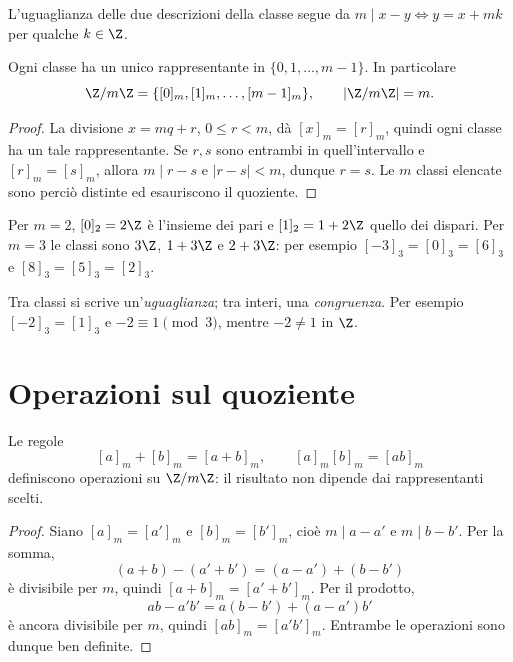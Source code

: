 L'uguaglianza delle due descrizioni della classe segue da $m\mid x-y\iff y=x+mk$ per qualche $k\in\Z$.

\begin{proposizione}
Ogni classe ha un unico rappresentante in $\{0,1,\ldots,m-1\}$. In particolare
\[
\Z/m\Z=\{[0]_m,[1]_m,\ldots,[m-1]_m\},\qquad |\Z/m\Z|=m.
\]
\end{proposizione}
\begin{proof}
La divisione $x=mq+r$, $0\le r<m$, dà $[x]_m=[r]_m$, quindi ogni classe ha un tale rappresentante. Se $r,s$ sono entrambi in quell'intervallo e $[r]_m=[s]_m$, allora $m\mid r-s$ e $|r-s|<m$, dunque $r=s$. Le $m$ classi elencate sono perciò distinte ed esauriscono il quoziente.
\end{proof}

\begin{esempio}
Per $m=2$, $[0]_2=2\Z$ è l'insieme dei pari e $[1]_2=1+2\Z$ quello dei dispari. Per $m=3$ le classi sono $3\Z$, $1+3\Z$ e $2+3\Z$: per esempio $[-3]_3=[0]_3=[6]_3$ e $[8]_3=[5]_3=[2]_3$.
\end{esempio}

\begin{schema}
\end{schema}

\begin{osservazione}
Tra classi si scrive un'\emph{uguaglianza}; tra interi, una \emph{congruenza}. Per esempio $[-2]_3=[1]_3$ e $-2\equiv1\pmod3$, mentre $-2\ne1$ in $\Z$.
\end{osservazione}

\section{Operazioni sul quoziente}
\begin{proposizione}\label{prop:operazioni-modulari}
Le regole
\[
[a]_m+[b]_m=[a+b]_m,\qquad [a]_m[b]_m=[ab]_m
\]
definiscono operazioni su $\Z/m\Z$: il risultato non dipende dai rappresentanti scelti.
\end{proposizione}
\begin{proof}
Siano $[a]_m=[a']_m$ e $[b]_m=[b']_m$, cioè $m\mid a-a'$ e $m\mid b-b'$. Per la somma,
\[
(a+b)-(a'+b')=(a-a')+(b-b')
\]
è divisibile per $m$, quindi $[a+b]_m=[a'+b']_m$. Per il prodotto,
\[
ab-a'b'=a(b-b')+(a-a')b'
\]
è ancora divisibile per $m$, quindi $[ab]_m=[a'b']_m$. Entrambe le operazioni sono dunque ben definite.
\end{proof}

